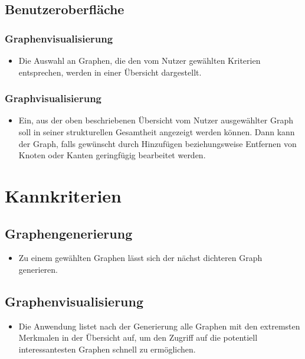 \documentclass[13pt]{scrreprt}
\begin{document}
\subsection{Benutzeroberfläche}
\subsubsection{Graphenvisualisierung}
	\begin{itemize}[label={}]
    	\item Die Auswahl an Graphen, die den vom Nutzer gewählten Kriterien entsprechen, werden in einer Übersicht dargestellt. 
	\end{itemize}

\subsubsection{Graphvisualisierung}
	\begin{itemize}[label={}]
    	\item Ein, aus der oben beschriebenen Übersicht vom Nutzer ausgewählter Graph soll in seiner strukturellen Gesamtheit angezeigt werden können. Dann kann der Graph, falls gewünscht durch Hinzufügen beziehungsweise Entfernen von Knoten oder Kanten geringfügig bearbeitet werden.
	\end{itemize}

\section{Kannkriterien}

\subsection{Graphengenerierung}
	\begin{itemize}[label={}]
	\item Zu einem gewählten Graphen lässt sich der nächst dichteren Graph generieren.
	\end{itemize}

\subsection{Graphenvisualisierung}
	\begin{itemize}[label={}]
	\item Die Anwendung listet nach der Generierung alle Graphen mit den extremsten Merkmalen in der Übersicht auf, um den Zugriff auf die potentiell interessantesten Graphen schnell zu ermöglichen.
	\end{itemize}
\end{document}
